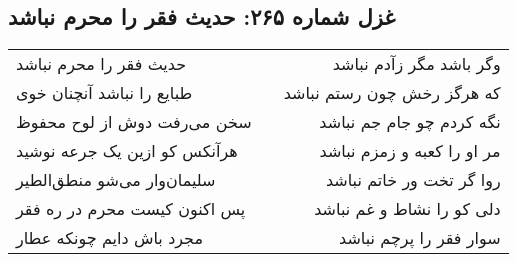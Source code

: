\begin{center}
\section*{غزل شماره ۲۶۵: حدیث فقر را محرم نباشد}
\label{sec:265}
\begin{longtable}{l p{0.5cm} r}
حدیث فقر را محرم نباشد
&&
وگر باشد مگر زآدم نباشد
\\
طبایع را نباشد آنچنان خوی
&&
که هرگز رخش چون رستم نباشد
\\
سخن می‌رفت دوش از لوح محفوظ
&&
نگه کردم چو جام جم نباشد
\\
هرآنکس کو ازین یک جرعه نوشید
&&
مر او را کعبه و زمزم نباشد
\\
سلیمان‌وار می‌شو منطق‌الطیر
&&
روا گر تخت ور خاتم نباشد
\\
پس اکنون کیست محرم در ره فقر
&&
دلی کو را نشاط و غم نباشد
\\
مجرد باش دایم چونکه عطار
&&
سوار فقر را پرچم نباشد
\\
\end{longtable}
\end{center}

